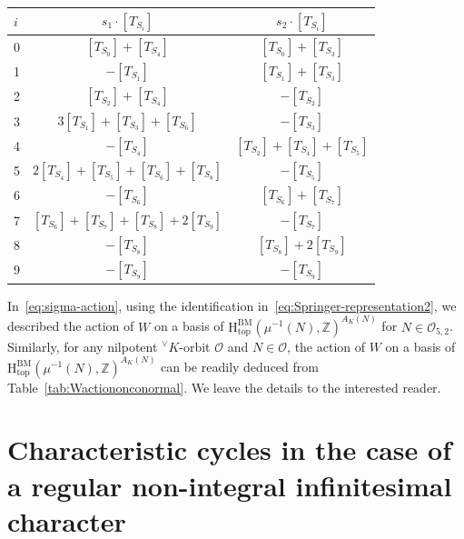 \documentclass[a4paper, 11pt]{article}
\begin{document}
\begin{minipage}{\linewidth}
\medskip
\centering
{} 
\label{tab:Wactiononconormal}   
\begin{tabular}{ | l | c | c | }
\hline 
 $i$ & $s_{1}\cdot [T_{S_i}]$ & $s_{2}\cdot [T_{S_i}]$ \\ \hline	\hline	
   0 & $[T_{S_0}]+[T_{S_4}]$ & $[T_{S_0}]+[T_{S_3}]$\\	\hline
   1 & $-[T_{S_1}]$ & $[T_{S_1}]+[T_{S_3}]$ \\ \hline
   2 & $[T_{S_2}]+[T_{S_4}]$ & $-[T_{S_2}]$ \\ \hline
   3 & $3[T_{S_1}]+[T_{S_3}]+[T_{S_6}]$ & $-[T_{S_3}]$ \\ \hline
   4 & $-[T_{S_4}]$ & $[T_{S_2}]+[T_{S_4}]+[T_{S_5}]$\\ \hline
   5 & $2[T_{S_4}]+[T_{S_5}]+[T_{S_6}]+[T_{S_8}]$ & $-[T_{S_5}]$\\ \hline
   6 & $-[T_{S_6}]$ & $[T_{S_6}]+[T_{S_7}]$\\ \hline
   7 & $[T_{S_6}]+[T_{S_7}]+[T_{S_8}]+2[T_{S_9}]$ & $-[T_{S_7}]$\\ \hline
   8 & $-[T_{S_8}]$ & $[T_{S_8}]+2[T_{S_9}]$\\ \hline
   9 & $-[T_{S_9}]$ & $-[T_{S_9}]$\\ 
 \hline  
\end{tabular}
\bigskip
\end{minipage}

In~\eqref{eq:sigma-action}, using the identification
in~\eqref{eq:Springer-representation2}, we described the action of $W$
on a basis of $\mathrm{H}_{\mathrm{top}}^{\mathrm{BM}}(\mu^{-1}(N),
\mathbb{Z})^{A_K(N)}$ for 
$N \in \mathcal{O}_{5,2}$.  
Similarly, for any nilpotent ${}^{\vee}K$-orbit $\mathcal{O}$ and $N
\in \mathcal{O}$, the action of $W$ on a basis of
$\mathrm{H}_{\mathrm{top}}^{\mathrm{BM}}(\mu^{-1}(N),
\mathbb{Z})^{A_K(N)}$ can be readily 
deduced from Table~\ref{tab:Wactiononconormal}. We leave the details
to the interested reader. 

\section{Characteristic cycles in the case of a regular non-integral
  infinitesimal character}
\label{section:G2computationsNon-integral}
\end{document}
